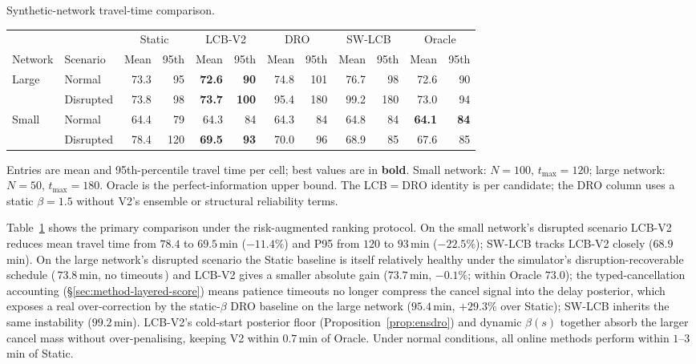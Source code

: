 \documentclass[opre,dblanonrev]{informs4}
\begin{document}
\begin{table}
\TABLE
{Synthetic-network travel-time comparison.\label{tab:main}}
{\begin{tabular}{ll rrrrrrrr rr}
\toprule
& & \multicolumn{2}{c}{Static} & \multicolumn{2}{c}{LCB-V2} & \multicolumn{2}{c}{DRO} & \multicolumn{2}{c}{SW-LCB} & \multicolumn{2}{c}{Oracle} \\
\cmidrule(lr){3-4}\cmidrule(lr){5-6}\cmidrule(lr){7-8}\cmidrule(lr){9-10}\cmidrule(lr){11-12}
Network & Scenario & Mean & 95th & Mean & 95th & Mean & 95th & Mean & 95th & Mean & 95th \\
\midrule
\multirow{2}{*}{Large} & Normal & 73.3 & 95 & \textbf{72.6} & \textbf{90} & 74.8 & 101 & 76.7 & 98 & 72.6 & 90 \\
& Disrupted & 73.8 & 98 & \textbf{73.7} & \textbf{100} & 95.4 & 180 & 99.2 & 180 & 73.0 & 94 \\
\midrule
\multirow{2}{*}{Small} & Normal & 64.4 & 79 & 64.3 & 84 & 64.3 & 84 & 64.8 & 84 & \textbf{64.1} & \textbf{84} \\
& Disrupted & 78.4 & 120 & \textbf{69.5} & \textbf{93} & 70.0 & 96 & 68.9 & 85 & 67.6 & 85 \\
\bottomrule
\end{tabular}}
{Entries are mean and 95th-percentile travel time per cell;
best values are in \textbf{bold}. Small network: $N{=}100$,
$t_{\max}{=}120$; large network: $N{=}50$, $t_{\max}{=}180$. Oracle
is the perfect-information upper bound. The LCB$=$DRO identity is per
candidate; the DRO column uses a static $\beta=1.5$ without V2's
ensemble or structural reliability terms.}
\end{table}

Table~\ref{tab:main} shows the primary comparison under the
risk-augmented ranking protocol. On the small network's disrupted
scenario LCB-V2 reduces
mean travel time from $78.4$ to $69.5$\,min ($-11.4\%$) and P95 from
$120$ to $93$\,min ($-22.5\%$); SW-LCB tracks LCB-V2 closely
($68.9$\,min). On the large network's disrupted scenario the Static
baseline is itself relatively healthy under the simulator's
disruption-recoverable schedule (\,$73.8$\,min, no timeouts\,) and
LCB-V2 gives a smaller absolute gain ($73.7$\,min, $-0.1\%$;
within Oracle $73.0$); the typed-cancellation accounting
(\S\ref{sec:method-layered-score}) means patience timeouts no longer
compress the cancel signal into the delay posterior, which
exposes a real over-correction by the static-$\beta$ DRO baseline
on the large network ($95.4$\,min, $+29.3\%$ over Static); SW-LCB
inherits the same instability ($99.2$\,min). LCB-V2's cold-start
posterior floor (Proposition~\ref{prop:ensdro}) and dynamic
$\beta(s)$ together absorb the larger cancel mass without
over-penalising, keeping V2 within $0.7$\,min of Oracle. Under normal
conditions, all online methods perform within $1$--$3$\,min of
Static.
\end{document}
